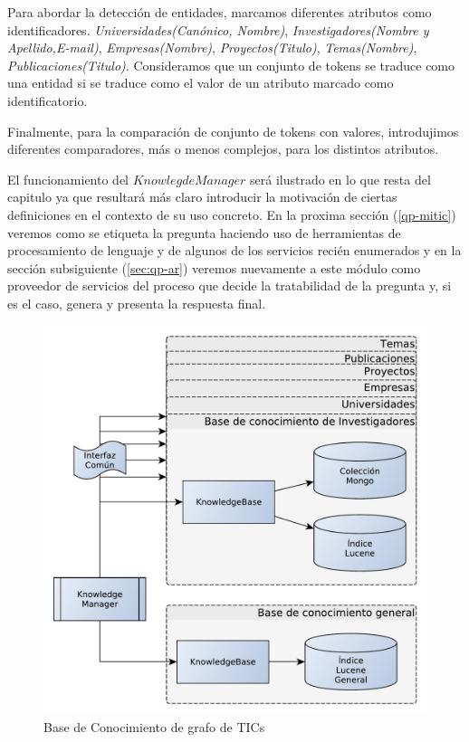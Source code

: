 Para abordar la detección de entidades, marcamos diferentes atributos como identificadores. \textit{Universidades(Canónico, Nombre)}, \textit{Investigadores(Nombre y Apellido,E-mail)}, \textit{Empresas(Nombre)}, \textit{Proyectos(Titulo)}, \textit{Temas(Nombre)}, \textit{Publicaciones(Titulo)}. Consideramos que un conjunto de tokens se traduce como una entidad si se traduce como el valor de un atributo marcado como identificatorio. 

Finalmente, para la comparación de conjunto de tokens con valores, introdujimos diferentes comparadores, más o menos complejos, para los distintos atributos. 

El funcionamiento del $KnowlegdeManager$ será ilustrado en lo que resta del capitulo ya que resultará más claro introducir la motivación de ciertas definiciones en el contexto de su uso concreto. En la proxima sección (\ref{qp-mitic}) veremos como se etiqueta la pregunta haciendo uso de herramientas de procesamiento de lenguaje y de algunos de los servicios recién enumerados y en la sección subsiguiente (\ref{sec:qp-ar}) veremos nuevamente a este módulo como proveedor de servicios del proceso que decide la tratabilidad de la pregunta y, si es el caso, genera y presenta la respuesta final.

\begin{figure}[H]
  \centering
    \includegraphics[scale=0.5]{graficos/KnowledgeManager}
  \caption{Base de Conocimiento de grafo de TICs}
  \label{fig:KnowledgeManager}
\end{figure}

